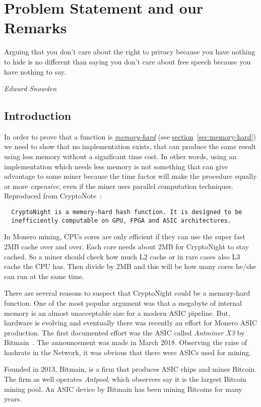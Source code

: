 \chapter{Problem Statement and our Remarks}
%
%
\epigraph{Arguing that you don't care about the right to privacy because you have nothing to hide is no different than saying you don't care about free speech because you have nothing to say.}{\textit{Edward Snowden}}
%
\section{Introduction}
In order to prove that a function is \hyperref[sec:memory-hard]{\emph{memory-hard}} (see \hyperref[sec:memory-hard]{section}~\ref{sec:memory-hard}) we need to show that no implementation exists, that can produce the same result using less memory without a significant time cost. In other words, using an implementation which needs less memory is not something that can give advantage to some miner because the time factor will make the procedure equally or more \emph{expensive}, even if the miner uses parallel computation techniques. Reproduced from CryptoNote~\cite{cryptonight}:
\begin{verbatim}
  CryptoNight is a memory-hard hash function. It is designed to be
  inefficiently computable on GPU, FPGA and ASIC architectures.
\end{verbatim}

In Monero mining, CPUs cores are only efficient if they can use the super fast 2MB cache over and over. Each core needs about 2MB for CryptoNight to stay cached. So a miner should check how much L2 cache or in rare cases also L3 cache the CPU has. Then divide by 2MB and this will be how many cores he/she can run at the same time.

There are several reasons to suspect that CryptoNight could be a memory-hard function. One of the most popular argument was that a megabyte of internal memory is an almost unacceptable size for a modern ASIC pipeline. But, hardware is evolving and eventually there was recently an effort for Monero ASIC production. The first documented effort was the ASIC called \emph{Antminer X3} by Bitmain~\cite{bitmain}. The announcement was made in March 2018. Observing the raise of hashrate in the Network, it was obvious that there were ASICs used for mining.

Founded in 2013, Bitmain, is a firm that produces ASIC chips and mines Bitcoin. The firm as well operates \emph{Antpool}, which observers say it is the largest Bitcoin mining pool. An ASIC device by Bitmain has been mining Bitcoins for many years.


